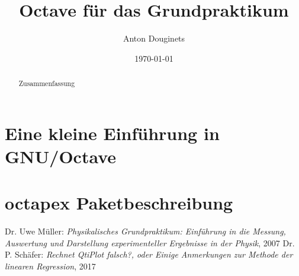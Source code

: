 \documentclass[a4paper,11pt]{article}
\title{Octave für das Grundpraktikum}
\author{Anton Douginets}
\date{\today}
\begin{document}
\maketitle
\thispagestyle{empty}

\begin{abstract}
Zusammenfassung
\end{abstract}

\tableofcontents
\newpage
{}

	\section{Eine kleine Einführung in GNU/Octave}

	\section{octapex Paketbeschreibung}

	\begin{thebibliography}{}
	Dr. Uwe Müller: \textit{Physikalisches Grundpraktikum: Einführung in die Messung, Auswertung und Darstellung experimenteller Ergebnisse in der Physik}, 2007
	 Dr. P. Schäfer: \textit{Rechnet QtiPlot falsch?, oder Einige Anmerkungen zur Methode der linearen Regression}, 2017


	\end{thebibliography}
\end{document}
